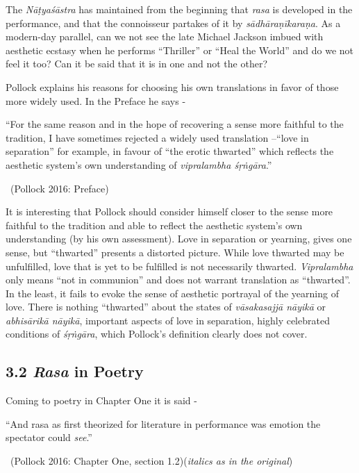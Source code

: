 The \textit{Nāṭyaśāstra} has maintained from the beginning that \textit{rasa} is developed in the performance, and that the connoisseur partakes of it by \textit{sādhāraṇīkaraṇa}. As a modern-day parallel, can we not see the late Michael Jackson imbued with aesthetic ecstasy when he performs “Thriller” or “Heal the World” and do we not feel it too? Can it be said that it is in one and not the other?

Pollock explains his reasons for choosing his own translations in favor of those more widely used. In the Preface he says -

\eject

\begin{myquote}
“For the same reason and in the hope of recovering a sense more faithful to the tradition, I have sometimes rejected a widely used translation –“love in separation” for example, in favour of “the erotic thwarted” which reflects the aesthetic system’s own understanding of \textit{vipralambha śṛṅgāra}.” 

~\hfill (Pollock 2016: Preface)
\end{myquote}

It is interesting that Pollock should consider himself closer to the sense more faithful to the tradition and able to reflect the aesthetic system’s own understanding (by his own assessment). Love in separation or yearning, gives one sense, but “thwarted” presents a distorted picture. While love thwarted may be unfulfilled, love that is yet to be fulfilled is not necessarily thwarted. \textit{Vipralambha} only means “not in communion” and does not warrant translation as “thwarted”. In the least, it fails to evoke the sense of aesthetic portrayal of the yearning of love. There is nothing “thwarted” about the states of \textit{vāsakasajjā nāyikā} or \textit{abhisārikā nāyikā}, important aspects of love in separation, highly celebrated conditions of \textit{śṛṅgāra}, which Pollock’s definition clearly does not cover.


\subsection*{3.2 \textit{Rasa} in Poetry}

Coming to poetry in Chapter One it is said -

\begin{myquote}
“And rasa as first theorized for literature in performance was emotion the spectator could \textit{see}.” 

~\hfill (Pollock 2016: Chapter One, section 1.2)(\textit{italics as in the original})
\end{myquote}

